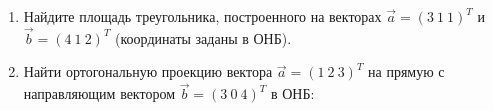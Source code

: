 \begin{enumerate}
   	\item Найдите площадь треугольника, построенного на векторах $\vec a = (3\ 1\ 1)^T$ и $\vec b = (4\ 1\ 2)^T$ (координаты заданы в ОНБ).
   	\vspace{5em}
   		
   	\item Найти ортогональную проекцию вектора $\vec a = (1\ 2\ 3)^T$ на прямую с направляющим вектором $\vec b = (3\ 0\ 4)^T$ в ОНБ:


\end{enumerate}